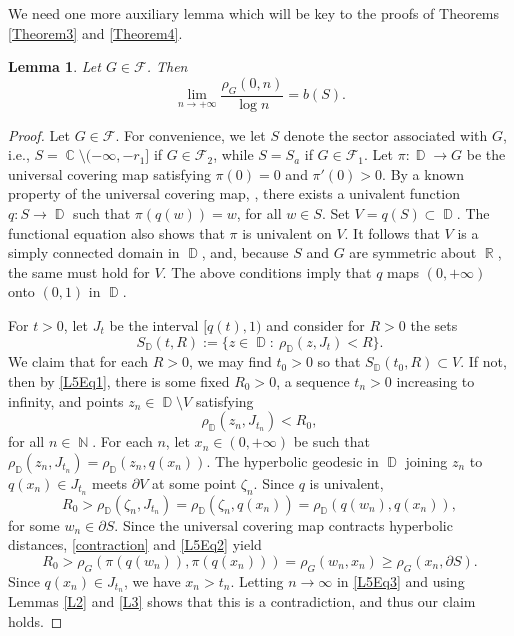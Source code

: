 \documentclass[11pt, letterpaper,leqno]{amsart}
\numberwithin{equation}{section}
\newtheorem{lemma}{Lemma}[section]
\theoremstyle{definition}
\DeclareMathOperator{\D}{\mathbb{D}}
\DeclareMathOperator{\N}{\mathbb{N}}
\DeclareMathOperator{\C}{\mathbb{C}}
\DeclareMathOperator{\R}{\mathbb{R}}
\begin{document}
We need one more auxiliary lemma which will be key to the proofs of Theorems \ref{Theorem3} and \ref{Theorem4}.
\begin{lemma}\label{L5}
Let $G\in\mathcal{F}$. Then
\begin{equation}\label{mainlimit}
\lim_{n\to +\infty}\frac{\rho_G(0,n)}{\log n} = b(S).
\end{equation}
\end{lemma}
\begin{proof}
Let $G\in\mathcal{F}$. For convenience, we let $S$ denote the sector associated with $G$, i.e., $S=\C\setminus (-\infty,-r_1]$ if $G\in\mathcal{F}_2$, while $S=S_a$ if $G\in\mathcal{F}_1$.
Let $\pi:\D\to G$ be the universal covering map satisfying $\pi(0)=0$ and $\pi'(0)>0$. By a known property of the universal covering map, \cite[page 81]{CDP}, there exists a univalent function $q:S\to\D$ such that $\pi(q(w))=w$, for all $w\in S$. Set $V=q(S)\subset\D$. The functional equation also shows that $\pi$ is univalent on $V$. It follows that $V$ is a simply connected domain in $\D$, and, because $S$ and $G$ are symmetric about $\R$, the same must hold for $V$. The above conditions imply that $q$ maps $(0,+\infty)$ onto $(0,1)$ in $\D$.

For $t>0$, let $J_t$ be the interval $[q(t),1)$ and consider for $R>0$ the sets 
\begin{equation}\label{L5Eq1}
	S_{\D}(t,R):=\{z\in\D:\ \rho_{\D}\left(z, J_t \right)<R \}.
\end{equation}
We claim that for each $R>0$, we may find $t_0>0$ so that $S_{\D}(t_0,R)\subset V$. If not, then  by \eqref{L5Eq1}, there is some fixed $R_0>0$, a sequence $t_n>0$ increasing to infinity, and points $z_n\in \D\setminus V$ satisfying
\[
\rho_{\D}\left(z_n, J_{t_n} \right)< R_0,
\]
for all $n\in\N$. For each $n$, let $x_n\in (0,+\infty)$ be such that
$\rho_{\D}(z_n,J_{t_n})=\rho_{\D}(z_n,q(x_n))$.
The hyperbolic geodesic in $\D$ joining $z_n$ to $q(x_n)\in J_{t_n}$ meets $\partial V$ at some point $\zeta_n$. Since $q$ is univalent, 
\begin{equation}\label{L5Eq2}
	R_0>\rho_{\D}\left(\zeta_n, J_{t_n} \right)=\rho_{\D}\left(\zeta_n, q(x_n) \right)=\rho_{\D}\left(q(w_n), q(x_n) \right),
\end{equation}
for some $w_n\in \partial S$. Since the universal covering map contracts hyperbolic distances, \eqref{contraction} and \eqref{L5Eq2} yield
\begin{equation}\label{L5Eq3}
	R_0>\rho_G\left(\pi(q(w_n)),\pi(q(x_n))\right)=\rho_G(w_n,x_n)\geq \rho_G(x_n,\partial S).
\end{equation}
Since $q(x_n)\in J_{t_n}$, we have $x_n>t_n$. Letting $n\to\infty$ in \eqref{L5Eq3} and using Lemmas \ref{L2} and \ref{L3} shows that this is a contradiction, and thus our claim holds. 


\end{proof}
\end{document}
